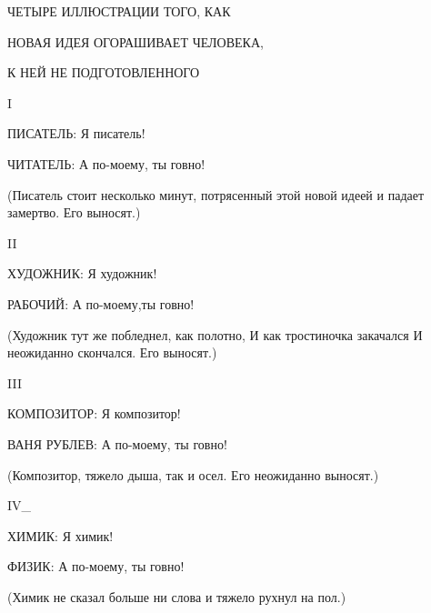 ЧЕТЫРЕ ИЛЛЮСТРАЦИИ ТОГО, КАК 

    \hspace{0.5cm}
    \parbox{10cm}{НОВАЯ ИДЕЯ ОГОРАШИВАЕТ ЧЕЛОВЕКА,}

    \hspace{1cm}
    \parbox{10cm}{К НЕЙ НЕ ПОДГОТОВЛЕННОГО}

I 

ПИСАТЕЛЬ: Я писатель! 

ЧИТАТЕЛЬ: А по-моему, ты говно! 

    \hspace{1cm}
    \parbox{10cm}{(Писатель стоит несколько минут,  потрясенный
    этой новой идеей и падает замертво. Его выносят.)}

II

\vspace{0.5cm}

ХУДОЖНИК: Я художник! 

РАБОЧИЙ: А по-моему,ты говно! 

    \hspace{1cm}
    \parbox{10cm}{(Художник тут же побледнел, как полотно,
    И как тростиночка  закачался 
    И неожиданно скончался.
    Его выносят.)}

\vspace{0.5cm}
    
III 

КОМПОЗИТОР: Я композитор! 

ВАНЯ РУБЛЕВ: А по-моему, ты говно! 

    \hspace{1cm}
    \parbox[2cm]{10cm}{(Композитор,  тяжело  дыша,  так и осел.
    Его неожиданно выносят.)}

IV\_ 

ХИМИК: Я химик!

ФИЗИК: А по-моему, ты говно!

    \hspace{1cm}
    \parbox[2cm]{10cm}{(Химик не сказал больше ни слова и 
    тяжело рухнул на пол.)}